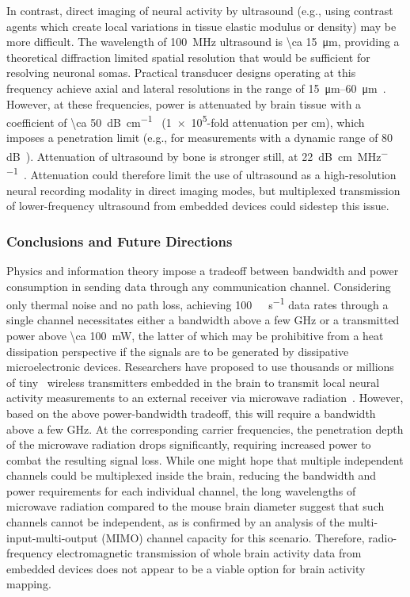 In contrast, direct imaging of neural activity by ultrasound (e.g., using contrast agents which create local variations in tissue elastic modulus or density) may be more difficult.
The wavelength of \SI{100}{\mega\hertz} ultrasound is \SI{\ca 15}{\micro\meter}, providing a theoretical diffraction limited spatial resolution that would be sufficient for resolving neuronal somas.
Practical transducer designs operating at this frequency achieve axial and lateral resolutions in the range of \SIrange{15}{60}{\um}~\cite{foster00}.
However, at these frequencies, power is attenuated by brain tissue with a coefficient of \SI{\ca 50}{\dB\per\centi\meter}~\cite{hoskins10} (\num{1e5}-fold attenuation per cm), which imposes a penetration limit (e.g., for
measurements with a dynamic range of 80 dB~\cite{foster00}).
Attenuation of ultrasound by bone is stronger still, at \SI{22}{\dB\per\cm\per\MHz}~\cite{hoskins10}.
Attenuation could therefore limit the use of ultrasound as a high-resolution neural recording modality in direct imaging modes, but multiplexed transmission of lower-frequency ultrasound from embedded devices could sidestep this issue.

\subsubsection{Conclusions and Future Directions}

Physics and information theory impose a tradeoff between bandwidth and power consumption in sending data through any communication channel.
Considering only thermal noise and no path loss, achieving \SI{100}{\giga\bit\per\second} data rates through a single channel necessitates either a bandwidth above a few \si{\giga\hertz} or a transmitted power above \SI{\ca 100}{\milli\watt}, the latter of which may be prohibitive from a heat dissipation perspective if the signals are to be generated by dissipative microelectronic devices.
Researchers have proposed to use thousands or millions of tiny~\cite{gomez10} wireless transmitters embedded in the brain to transmit local neural activity measurements to an external receiver via microwave radiation~\cite{dyson09}.
However, based on the above power-bandwidth tradeoff, this will require a bandwidth above a few \si{\giga\hertz}.
At the corresponding carrier frequencies, the penetration depth of the microwave radiation drops significantly, requiring increased power to combat the resulting signal loss.
While one might hope that multiple independent channels could be multiplexed inside the brain, reducing the bandwidth and power requirements for each individual channel, the long wavelengths of microwave radiation compared to the mouse brain diameter suggest that such channels cannot be independent, as is confirmed by an analysis of the multi-input-multi-output (MIMO) channel capacity for this scenario.
Therefore, radio-frequency electromagnetic transmission of whole brain activity data from embedded devices does not appear to be a viable option for brain activity mapping.

